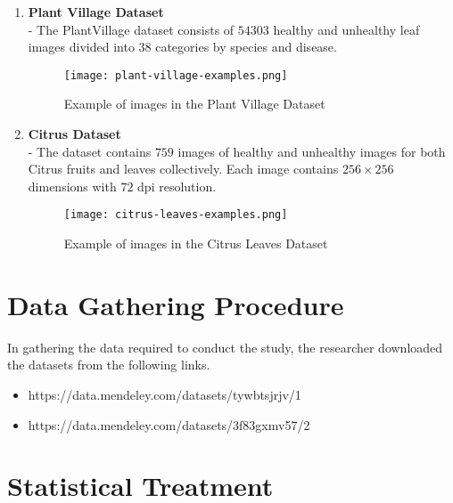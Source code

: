 \begin{enumerate}
    \item \textbf{Plant Village Dataset}  \\ 
        - The PlantVillage dataset consists of $54303$ healthy and unhealthy leaf 
         images divided into $38$ categories by species and disease. 
    
         \begin{figure}[H]
            \centering 
            \texttt{[image: plant-village-examples.png]}
            \caption{Example of images in the Plant Village Dataset}
         \end{figure}


    \item \textbf{Citrus Dataset} \\ 
        - The dataset contains $759$ images of healthy and unhealthy images for both Citrus fruits and
         leaves collectively. Each image contains $256 \times 256$ dimensions with $72$ dpi resolution.  \\ 

         \begin{figure}[H]
            \centering 
            \texttt{[image: citrus-leaves-examples.png]}
            \caption{Example of images in the Citrus Leaves Dataset}
         \end{figure}


\end{enumerate}

\section{Data Gathering Procedure}
In gathering the data required to conduct the study, the 
researcher downloaded the datasets from the following links.

\begin{itemize}
    \item https://data.mendeley.com/datasets/tywbtsjrjv/1
    \item https://data.mendeley.com/datasets/3f83gxmv57/2
\end{itemize}


\section{Statistical Treatment}


